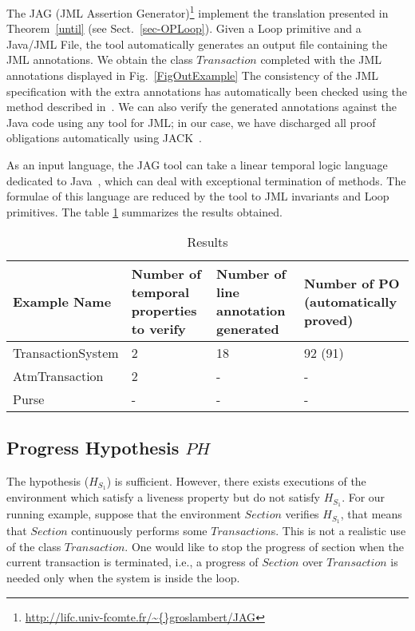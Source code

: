 The \textsf{JAG} (JML Assertion Generator)\footnote{
\url{http://lifc.univ-fcomte.fr/\~{}groslambert/JAG}}
implement the translation presented in Theorem~\ref{until} 
(see Sect.~\ref{sec-OPLoop}). Given 
a \textsf{Loop} primitive and a Java/JML File, the tool 
automatically generates  an output file containing the
 JML annotations. 
We obtain the class $Transaction$ completed with the
JML annotations  displayed in Fig.~\ref{FigOutExample}
The consistency of the JML specification with the extra annotations
 has automatically been checked 
using the method described in~\cite{bdgZB05}. 
We can also verify the generated annotations  against the Java 
code using any tool for JML; 
in our case, we have discharged
all proof obligations
 automatically using JACK~\cite{BurdyRL03}.

As an input language, the \textsf{JAG} tool can take 
a linear temporal logic language
dedicated to Java~\cite{Huis02,articleJournalTL}, which can deal
with exceptional termination of methods. The formulae of this 
language are reduced by the tool to JML invariants 
and \textsf{Loop} primitives. The table \ref{table-result} summarizes
the results obtained.
\begin{table}

{\scriptsize
\begin{tabularx}{\linewidth}
{|X|X|X|X|}
\hline
Example Name & 
Number of temporal properties to verify & 
Number of line annotation generated & 
Number of PO (automatically proved) \\
\hline
TransactionSystem & 2 & 18 & 92  (91) \\
\hline
AtmTransaction & 2 & - & - \\
Purse & - & - & -\\
\hline
\end{tabularx}
}
\caption{Results}
\label{table-result}
\end{table}


\subsection{Progress Hypothesis $PH$}
\label{sec-env}

The hypothesis ($H_{S_1}$) is sufficient. However, there exists 
executions of the environment which satisfy a liveness property but 
do not satisfy $H_{S_1}$. %
For our running example, suppose that the environment $Section$ 
verifies  $H_{S_1}$, that means that 
$Section$ continuously performs some $Transaction$s. This is not a realistic
use of the class $Transaction$. One would like to stop the 
progress of section when the current transaction is terminated,
i.e., a progress of $Section$ over $Transaction$ is needed
only when the system is inside the loop. 

